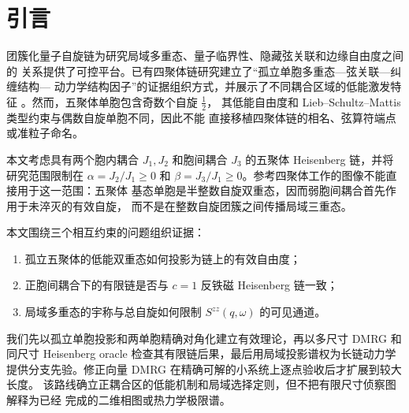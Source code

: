 \section{引言}

团簇化量子自旋链为研究局域多重态、量子临界性、隐藏弦关联和边缘自由度之间的
关系提供了可控平台。已有四聚体链研究建立了“孤立单胞多重态—弦关联—纠缠结构—
动力学结构因子”的证据组织方式，并展示了不同耦合区域的低能激发特征
\cite{li2026tetramer}。然而，五聚体单胞包含奇数个自旋 $\frac{1}{2}$，
其低能自由度和 Lieb--Schultz--Mattis 类型约束与偶数自旋单胞不同，因此不能
直接移植四聚体链的相名、弦算符端点或准粒子命名。

本文考虑具有两个胞内耦合 $J_1,J_2$ 和胞间耦合 $J_3$ 的五聚体
Heisenberg 链，并将研究范围限制在 $\alpha=J_2/J_1\geq0$ 和
$\beta=J_3/J_1\geq0$。参考四聚体工作的图像不能直接用于这一范围：五聚体
基态单胞是半整数自旋双重态，因而弱胞间耦合首先作用于未淬灭的有效自旋，
而不是在整数自旋团簇之间传播局域三重态。

本文围绕三个相互约束的问题组织证据：

\begin{enumerate}
  \item 孤立五聚体的低能双重态如何投影为链上的有效自由度；
  \item 正胞间耦合下的有限链是否与 $c=1$ 反铁磁 Heisenberg 链一致；
  \item 局域多重态的宇称与总自旋如何限制 $S^{zz}(q,\omega)$ 的可见通道。
\end{enumerate}

我们先以孤立单胞投影和两单胞精确对角化建立有效理论，再以多尺寸 DMRG 和
同尺寸 Heisenberg oracle 检查其有限链后果，最后用局域投影谱权为长链动力学
提供分支先验。修正向量 DMRG 在精确可解的小系统上逐点验收后才扩展到较大长度。
该路线确立正耦合区的低能机制和局域选择定则，但不把有限尺寸侦察图解释为已经
完成的二维相图或热力学极限谱。

